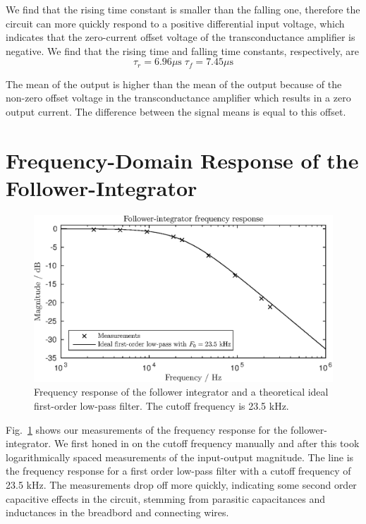 We find that the rising time constant is smaller than the falling one, therefore the circuit can more quickly respond to a 
positive differential input voltage, which indicates that the zero-current offset voltage of the transconductance amplifier is
negative. We find that the rising time and falling time constants, respectively, are
\begin{equation*}
    \tau_r = 6.96\mu\mathrm{s} \; \tau_f = 7.45\mu\mathrm{s}
\end{equation*}

The mean of the output is higher than the mean of the output because of the non-zero offset voltage in the transconductance amplifier
which results in a zero output current. The difference between the signal means is equal to this offset.

\section{Frequency-Domain Response of the Follower-Integrator}
\begin{figure}
    \center
    \includegraphics{ex3-freqresp.eps}
    \caption{Frequency response of the follower integrator and a theoretical ideal first-order low-pass filter. The cutoff frequency is 23.5 kHz.}
    \label{fig:ex3-1}
\end{figure}
Fig.~\ref{fig:ex3-1} shows our measurements of the frequency response for the follower-integrator. We first honed in on the cutoff frequency manually
and after this took logarithmically spaced measurements of the input-output magnitude. The line is the frequency response for a first order low-pass
filter with a cutoff frequency of 23.5 kHz. The measurements drop off more quickly, indicating some second order capacitive effects in the circuit,
stemming from parasitic capacitances and inductances in the breadbord and connecting wires.

